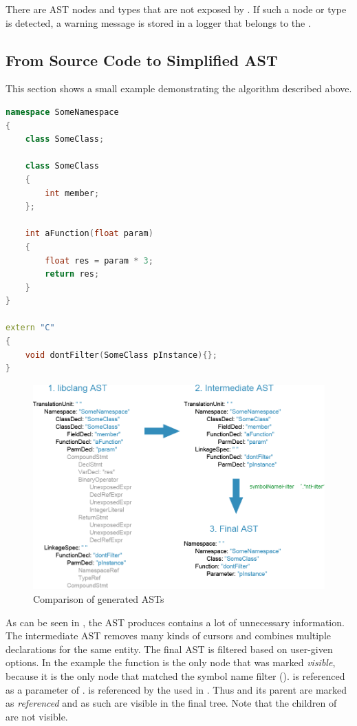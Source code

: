 There are AST nodes and types that are not exposed by . If such a node or type is detected, a warning message is stored in a logger that belongs to the .

\newpage
\subsection{From Source Code to Simplified AST}

This section shows a small example demonstrating the algorithm described above.

\SingleSpacing
\begin{lstlisting}[language=C++, caption=Example input code for \myProperName{CPPAnalyzer}]
namespace SomeNamespace
{
	class SomeClass;
	
	class SomeClass
	{
		int member;
	};
	
	int aFunction(float param)
	{
		float res = param * 3;
		return res;
	}
}

extern "C"
{
	void dontFilter(SomeClass pInstance){};
}
\end{lstlisting}
\OnehalfSpacing

\vspace{15pt}
\begin{figure}[h] %
	\centering
		\includegraphics[scale=0.45]{Images/TreeExample.png}
	\caption{Comparison of generated ASTs}
	\label{fig:TreeExample}
\end{figure}


As can be seen in , the AST  produces contains a lot of unnecessary information. The intermediate AST removes many kinds of cursors and combines multiple declarations for the same entity. The final AST is filtered based on user-given options. In the example the function  is the only node that was marked \textit{visible}, because it is the only node that matched the symbol name filter ().  is referenced as a parameter of .  is referenced by the  used in . Thus  and its parent  are marked as \textit{referenced} and as such are visible in the final tree. Note that the children of  are not visible.

